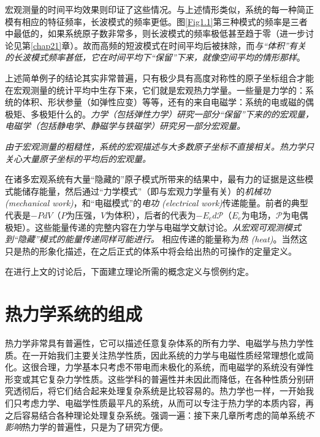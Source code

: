 宏观测量的时间平均效果则印证了这些情况。与上述情形类似，系统的每一种简正模有相应的特征频率，长波模式的频率更低。图\ref{Fig1.1}第三种模式的频率是三者中最低的，如果系统原子数非常多，则长波模式的频率极低甚至趋于零（进一步讨论见第\ref{chap21}章）。故而高频的短波模式在时间平均后被抹除，而{\it 与“体积”有关的长波模式频率甚低，它在时间平均下“保留”下来，就像空间平均的情形那样}。

上述简单例子的结论其实非常普遍，只有极少具有高度对称性的原子坐标组合才能在宏观测量的统计平均中生存下来，它们就是宏观热力学量。一些量是力学的：系统的体积、形状参量（如弹性应变）等等，还有的来自电磁学：系统的电或磁的偶极矩、多极矩什么的。{\it 力学（包括弹性力学）研究一部分“保留”下来的的宏观量，电磁学（包括静电学、静磁学与铁磁学）研究另一部分宏观量。}

{\it 由于宏观测量的粗糙性，系统的宏观描述与大多数原子坐标不直接相关。热力学只关心大量原子坐标的平均后的宏观量。} 

在诸多宏观系统有大量“隐藏的”原子模式所带来的结果中，最有力的证据是这些模式能储存能量，然后通过“力学模式”（即与宏观力学量有关）的{\it 机械功 (mechanical work)}，和“电磁模式”的{\it 电功 (electrical work)}传递能量。前者的典型代表是$-P dV$（$P$为压强，$V$为体积），后者的代表为$-E_e d\mathscr{P}$（$E_e$为电场，$\mathscr{P}$为电偶极矩）。这些能量传递的完整内容在力学与电磁学文献讨论。{\it 从宏观可观测模式到“隐藏”模式的能量传递同样可能进行。} 相应传递的能量称为{\it 热 (heat)}。当然这只是热的形象化描述，在之后正式的体系中将会给出热的可操作的定量定义。

在进行上文的讨论后，下面建立理论所需的概念定义与惯例约定。


\section{热力学系统的组成}
\label{sec1.3}
热力学非常具有普遍性，它可以描述任意复杂体系的所有力学、电磁学与热力学性质。在一开始我们主要关注热学性质，因此系统的力学与电磁性质经常理想化或简化。这很合理，力学基本只考虑不带电而未极化的系统，而电磁学的系统没有弹性形变或其它复杂力学性质。这些学科的普遍性并未因此而降低，在各种性质分别研究透彻后，将它们结合起来处理复杂系统是比较容易的。热力学也一样，一开始我们只考虑力学、电磁学性质最平凡的系统，从而可以专注于热力学的本质内容，再之后容易结合各种理论处理复杂系统。强调一遍：接下来几章所考虑的简单系统{\it 不影响}热力学的普遍性，只是为了研究方便。

